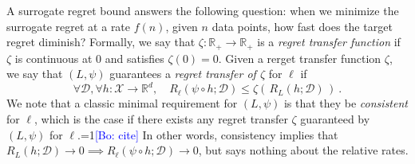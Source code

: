 \documentclass{article}
\theoremstyle{definition}\newtheorem{definition}{Definition}
\theoremstyle{definition}\newtheorem{assumption}{Assumption}
\newcommand{\Comments}{1}
\newcommand{\mynote}[2]{\ifnum\Comments=1\textcolor{#1}{#2}\fi}
\newcommand{\raf}[1]{\mynote{green}{[RF: #1]}}
\newcommand{\bo}[1]{\mynote{blue}{[Bo: #1]}}
\newcommand{\reals}{\mathbb{R}}
\newcommand{\D}{\mathcal{D}}
\newcommand{\X}{\mathcal{X}}
\begin{document}
A surrogate regret bound answers the following question: when we minimize the surrogate regret at a rate $f(n)$, given $n$ data points, how fast does the target regret diminish?
Formally, we say that $\zeta : \reals_+ \to \reals_+$ is a \emph{regret transfer function} if $\zeta$ is continuous at $0$ and satisfies $\zeta(0) = 0$.
Given a rerget transfer function $\zeta$, we say that $(L,\psi)$ guarantees a \emph{regret transfer of $\zeta$} for $\ell$ if
\begin{equation}
  \label{eq:surrogate-regret-bound}
  \forall \D, \forall h:\X\to\reals^d, \quad R_\ell(\psi\circ h;\D) \leq \zeta(\, R_L(h;\D) \,)~.
\end{equation}
We note that a classic minimal requirement for $(L,\psi)$ is that they be \emph{consistent} for $\ell$, which is the case if there exists any regret transfer $\zeta$ guaranteed by $(L,\psi)$ for $\ell$.\bo{cite}
In other words, consistency implies that $R_L(h;\D) \to 0 \implies R_{\ell}(\psi \circ h;\D) \to 0$, but says nothing about the relative rates.


\end{document}
